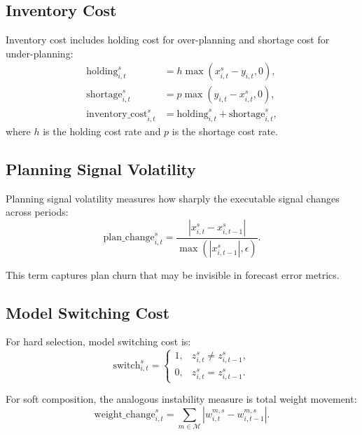 \subsection{Inventory Cost}

Inventory cost includes holding cost for over-planning and shortage cost for under-planning:
\begin{align}
    \mathrm{holding}_{i,t}^{s} &= h \max(x_{i,t}^{s} - y_{i,t}, 0), \\
    \mathrm{shortage}_{i,t}^{s} &= p \max(y_{i,t} - x_{i,t}^{s}, 0), \\
    \mathrm{inventory\_cost}_{i,t}^{s} &= \mathrm{holding}_{i,t}^{s} + \mathrm{shortage}_{i,t}^{s},
\end{align}
where $h$ is the holding cost rate and $p$ is the shortage cost rate.

\subsection{Planning Signal Volatility}

Planning signal volatility measures how sharply the executable signal changes across periods:
\begin{equation}
    \mathrm{plan\_change}_{i,t}^{s}
    =
    \frac{|x_{i,t}^{s} - x_{i,t-1}^{s}|}{\max(|x_{i,t-1}^{s}|, \epsilon)}.
\end{equation}

This term captures plan churn that may be invisible in forecast error metrics.

\subsection{Model Switching Cost}

For hard selection, model switching cost is:
\begin{equation}
    \mathrm{switch}_{i,t}^{s}
    =
    \begin{cases}
    1, & z_{i,t}^{s} \neq z_{i,t-1}^{s}, \\
    0, & z_{i,t}^{s} = z_{i,t-1}^{s}.
    \end{cases}
\end{equation}

For soft composition, the analogous instability measure is total weight movement:
\begin{equation}
    \mathrm{weight\_change}_{i,t}^{s}
    =
    \sum_{m \in \mathcal{M}}
    |w_{i,t}^{m,s} - w_{i,t-1}^{m,s}|.
\end{equation}

